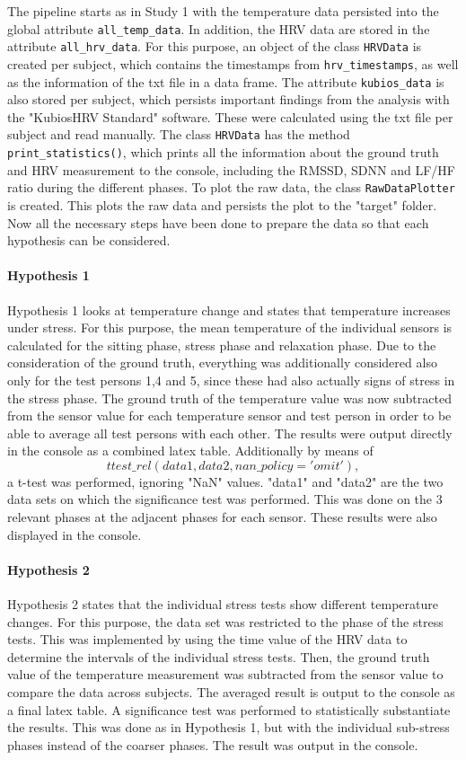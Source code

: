 The pipeline starts as in Study 1 with the temperature data persisted into the global attribute \texttt{all\_temp\_data}.
In addition, the HRV data are stored in the attribute \texttt{all\_hrv\_data}.
For this purpose, an object of the class \texttt{HRVData} is created per subject, which contains the timestamps from \texttt{hrv\_timestamps}, as well as the information of the txt file in a data frame.
The attribute \texttt{kubios\_data} is also stored per subject, which persists important findings from the analysis with the "KubiosHRV Standard" software.
These were calculated using the txt file per subject and read manually.
The class \texttt{HRVData} has the method \texttt{print\_statistics()}, which prints all the information about the ground truth and HRV measurement to the console, including the RMSSD, SDNN and LF/HF ratio during the different phases.
To plot the raw data, the class \texttt{RawDataPlotter} is created.
This plots the raw data and persists the plot to the "target" folder.
Now all the necessary steps have been done to prepare the data so that each hypothesis can be considered. 

\paragraph{Hypothesis 1}
Hypothesis 1 looks at temperature change and states that temperature increases under stress.
For this purpose, the mean temperature of the individual sensors is calculated for the sitting phase, stress phase and relaxation phase. 
Due to the consideration of the ground truth, everything was additionally considered also only for the test persons 1,4 and 5, since these had also actually signs of stress in the stress phase.
The ground truth of the temperature value was now subtracted from the sensor value for each temperature sensor and test person in order to be able to average all test persons with each other.
The results were output directly in the console as a combined latex table.
Additionally by means of 
\[
ttest\_rel(data1, data2, nan\_policy='omit'),
\]
a t-test was performed, ignoring "NaN" values. 
"data1" and "data2" are the two data sets on which the significance test was performed. 
This was done on the 3 relevant phases at the adjacent phases for each sensor. 
These results were also displayed in the console.

\paragraph{Hypothesis 2}
Hypothesis 2 states that the individual stress tests show different temperature changes.
For this purpose, the data set was restricted to the phase of the stress tests. 
This was implemented by using the time value of the HRV data to determine the intervals of the individual stress tests.
Then, the ground truth value of the temperature measurement was subtracted from the sensor value to compare the data across subjects. 
The averaged result is output to the console as a final latex table.
A significance test was performed to statistically substantiate the results.
This was done as in Hypothesis 1, but with the individual sub-stress phases instead of the coarser phases.
The result was output in the console.